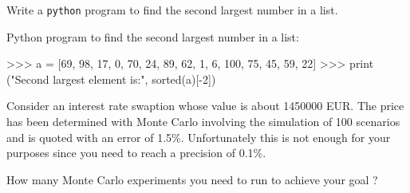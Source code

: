 \documentclass[12pt,a4paper]{exam}
\begin{document}
\begin{questions}
%
%
%
%

\question Write a \texttt{python} program to find the second largest number in a list.
\makeemptybox{3cm}

\begin{solution}
Python program to find the second largest number in a list:

\begin{ipython}
>>> a = [69, 98, 17, 0, 70, 24, 89, 62, 1, 6, 100, 75, 45, 59, 22]
>>> print ("Second largest element is:", sorted(a)[-2])
\end{ipython}
\end{solution}

%

\question Consider an interest rate swaption whose value is about 1450000 EUR. The price has been determined with Monte Carlo involving the simulation of 100 scenarios and is quoted with an error of 1.5\%. Unfortunately this is not enough for your purposes since you need to reach a precision of 0.1\%.

How many Monte Carlo experiments you need to run to achieve your goal ?


\end{questions}
\end{document}
